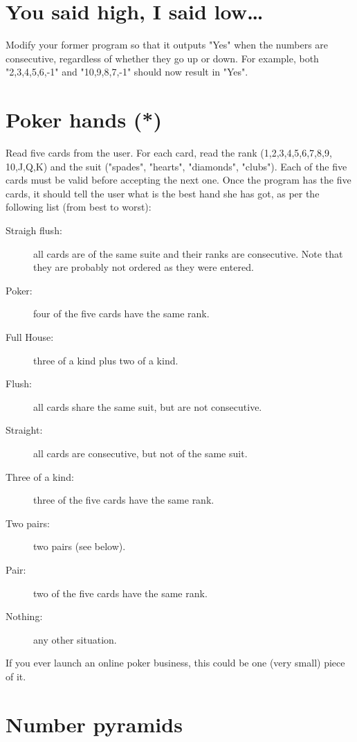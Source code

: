 \documentclass{article}
\begin{document}
\section{You said high, I said low\ldots}
\label{sec:you-said-high}

Modify your former program so that it outputs "Yes" when the numbers
are consecutive, regardless of whether they go up or down. For
example, both "2,3,4,5,6,-1" and "10,9,8,7,-1" should now result in
"Yes".

\section{Poker hands (*)}
\label{sec:poker-hands}

Read five cards from the user. For each card, read the rank
(1,2,3,4,5,6,7,8,9, 10,J,Q,K) and the suit ("spades", "hearts",
"diamonds", "clubs"). Each of the five cards must be valid before
accepting the next one.  Once the program has the five cards, it
should tell the user what is the best hand she has got, as per the
following list (from best to worst):

\begin{description}
\item[Straigh flush: ] all cards are of the same suite and
     their ranks are consecutive. Note that they are probably
     not ordered as they were entered.
   \item[Poker: ] four of the five cards have the same
     rank.
   \item[Full House: ] three of a kind plus two of a kind.
   \item[Flush: ] all cards share the same suit, but are not
     consecutive.
   \item[Straight: ] all cards are consecutive, but not of the same
     suit.
   \item[Three of a kind: ] three of the five cards have the same
     rank.
   \item[Two pairs: ] two pairs (see below).
   \item[Pair:] two of the five cards have the same rank.
   \item[Nothing: ] any other situation.
\end{description}

If you ever launch an online poker business, this could be one (very
small) piece of it.

\section{Number pyramids}
\label{sec:number-pyramids}
\end{document}
